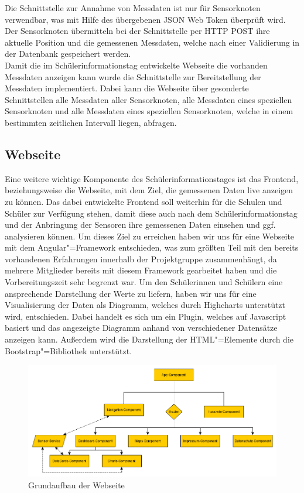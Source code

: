Die Schnittstelle zur Annahme von Messdaten ist nur für Sensorknoten verwendbar, was mit Hilfe des übergebenen JSON Web Token überprüft wird.
Der Sensorknoten übermitteln bei der Schnittstelle per HTTP POST ihre aktuelle Position und die gemessenen Messdaten, welche nach einer Validierung in der Datenbank gespeichert werden. \\
Damit die im Schülerinformationstag entwickelte Webseite die vorhanden Messdaten anzeigen kann wurde die Schnittstelle zur Bereitstellung der Messdaten implementiert.
Dabei kann die Webseite über gesonderte Schnittstellen alle Messdaten aller Sensorknoten, alle Messdaten eines speziellen Sensorknoten und alle Messdaten eines speziellen Sensorknoten, welche in einem bestimmten zeitlichen Intervall liegen, abfragen.  

\subsection{Webseite}

Eine weitere wichtige Komponente des Schülerinformationstages ist das Frontend, beziehungsweise die Webseite, mit dem Ziel, die gemessenen Daten live anzeigen zu können.
Das dabei entwickelte Frontend soll weiterhin für die Schulen und Schüler zur Verfügung stehen, damit diese auch nach dem Schülerinformationstag und der Anbringung der Sensoren ihre gemessenen Daten einsehen und ggf. analysieren können.
Um dieses Ziel zu erreichen haben wir uns für eine Webseite mit dem Angular"=Framework entschieden, was zum größten Teil mit den bereits vorhandenen Erfahrungen innerhalb der Projektgruppe zusammenhängt, da mehrere Mitglieder bereits mit diesem Framework gearbeitet haben und die Vorbereitungszeit sehr begrenzt war.
Um den Schülerinnen und Schülern eine ansprechende Darstellung der Werte zu liefern, haben wir uns für eine Visualisierung der Daten als Diagramm, welches durch Highcharts unterstützt wird, entschieden.
Dabei handelt es sich um ein Plugin, welches auf Javascript basiert und das angezeigte Diagramm anhand von verschiedener Datensätze anzeigen kann.
Außerdem wird die Darstellung der HTML"=Elemente durch die Bootstrap"=Bibliothek unterstützt.

\begin{figure}[H]
	\centering
	\includegraphics[width=\textwidth]{./ressourcen/schit-aufbau-frontend.png}
	\caption{Grundaufbau der Webseite}
\end{figure}

